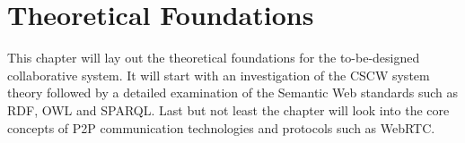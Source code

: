 
\chapter{Theoretical Foundations} %
\label{cha:theoretical_foundations}

This chapter will lay out the theoretical foundations for the to-be-designed collaborative system. It will start with an investigation of the \gls{CSCW} system theory followed by a detailed examination of the Semantic Web standards such as \gls{RDF}, \gls{OWL} and \gls{SPARQL}. Last but not least the chapter will look into the core concepts of \gls{P2P} communication technologies and protocols such as \gls{WebRTC}.







